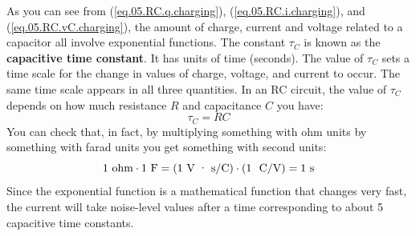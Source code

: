 As you can see from (\ref{eq.05.RC.q.charging}), (\ref{eq.05.RC.i.charging}), and (\ref{eq.05.RC.vC.charging}), the amount of charge, current and voltage related to a capacitor all involve exponential functions. The constant $\tau_{C}$ is known as the \textbf{capacitive time constant}. It has units of time (seconds). The value of $\tau_{C}$ sets a time scale for the change in values of charge, voltage, and current to occur. The same time scale appears in all three quantities. In an RC circuit, the value of $\tau_{C}$ depends on how much resistance $R$ and capacitance $C$ you have:
\begin{equation}
    \tau_{C} = R C
    \label{eq.05.tauC}
\end{equation}
You can check that, in fact, by multiplying something with ohm units by something with farad units you get something with second units:
\begin{equation}
    1 \ \text{ohm} \cdot 1 \ \text{F} = \left(1 \ \text{V{ }\textperiodcentered{ }s/C}\right) \cdot \left(1 \ \text{ C/V}\right) = 1 \ \text{s}
\end{equation}
Since the exponential function is a mathematical function that changes very fast, the current will take noise-level values after a time corresponding to about 5 capacitive time constants.
%
